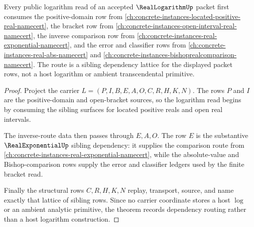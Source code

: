 \begin{theorem}
\label{thm:real-logarithm-sibling-dependency-route}
Every public logarithm read of an accepted $\RealLogarithmUp$ packet first consumes the positive-domain row from \autoref{ch:concrete-instances-located-positive-real-namecert}, the bracket row from \autoref{ch:concrete-instances-open-interval-real-namecert}, the inverse comparison row from \autoref{ch:concrete-instances-real-exponential-namecert}, and the error and classifier rows from \autoref{ch:concrete-instances-real-abs-namecert} and \autoref{ch:concrete-instances-bishoprealcomparison-namecert}. The route is a sibling dependency lattice for the displayed packet rows, not a host logarithm or ambient transcendental primitive.
\end{theorem}
\begin{proof}
Project the carrier $L=(P,I,B,E,A,O,C,R,H,K,N)$. The rows $P$ and $I$ are the positive-domain and open-bracket sources, so the logarithm read begins by consuming the sibling surfaces for located positive reals and open real intervals.

The inverse-route data then passes through $E,A,O$. The row $E$ is the substantive $\RealExponentialUp$ sibling dependency: it supplies the comparison route from \autoref{ch:concrete-instances-real-exponential-namecert}, while the absolute-value and Bishop-comparison rows supply the error and classifier ledgers used by the finite bracket read.

Finally the structural rows $C,R,H,K,N$ replay, transport, source, and name exactly that lattice of sibling rows. Since no carrier coordinate stores a host $\log$ or an ambient analytic primitive, the theorem records dependency routing rather than a host logarithm construction.
\end{proof}



